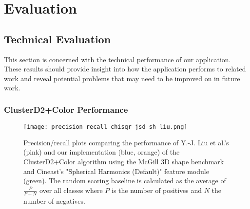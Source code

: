 \chapter{Evaluation}

\section{Technical Evaluation}

This section is concerned with the technical performance of our application. These results should provide insight
into how the application performs to related work and reveal potential problems that may need to be improved on
in future work.

\subsection{ClusterD2+Color Performance}

\begin{figure}
\centering
\captionsetup{width=0.8\textwidth}
\texttt{[image: precision\_recall\_chisqr\_jsd\_sh\_liu.png]}
\caption{Precision/recall plots comparing the performance of Y.-J. Liu et al.'s (pink) and our implementation (blue, orange) of the ClusterD2+Color algorithm using the McGill 3D shape benchmark \cite{mcgill_shape_benchmark} and Cineast's "Spherical Harmonics (Default)" feature module (green). The random scoring baseline is calculated as the average of $\frac{P}{P+N}$ over all classes where $P$ is the number of positives and $N$ the number of negatives.}
\label{fig:precision_recall}
\end{figure}

